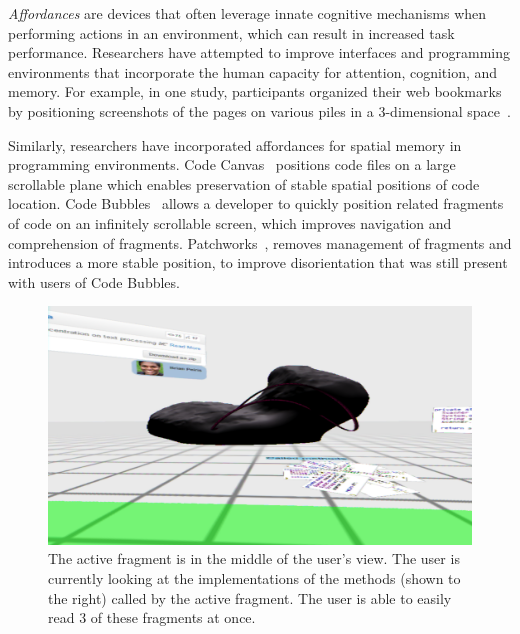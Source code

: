 \documentclass[conference]{IEEEtran}
\begin{document}
\emph{Affordances} are devices that often leverage innate cognitive mechanisms when performing actions in an environment, which can result in increased task performance. 
Researchers have attempted to improve interfaces and programming environments that incorporate the human capacity for attention, cognition, and memory.
For example, in one study, participants organized their web bookmarks by positioning screenshots of the pages on various piles in a 3-dimensional space~\cite{Robertson:1998}. 

Similarly, researchers have incorporated affordances for spatial memory in programming environments.  Code Canvas~\cite{DeLine:CodeCanvas} positions code files on a large scrollable plane which enables preservation of stable spatial positions of code location.  Code Bubbles~\cite{Bragdon:CodeBubbles} allows a developer to quickly position related fragments of code on an infinitely scrollable screen, which improves navigation and comprehension of fragments.  Patchworks~\cite{Henley:2014}, removes management of fragments and introduces a more stable position, to improve disorientation that was still present with users of Code Bubbles.

\begin{figure}[ht]
\centering
\includegraphics[width=\linewidth]{figures/unwarped_comet2}
\caption{The active fragment is in the middle of the user's view. The user is currently looking at the implementations of the methods (shown to the right) called by the active fragment. The user is able to easily read 3 of these fragments at once.  \label{immersion}}
\end{figure}
\end{document}
